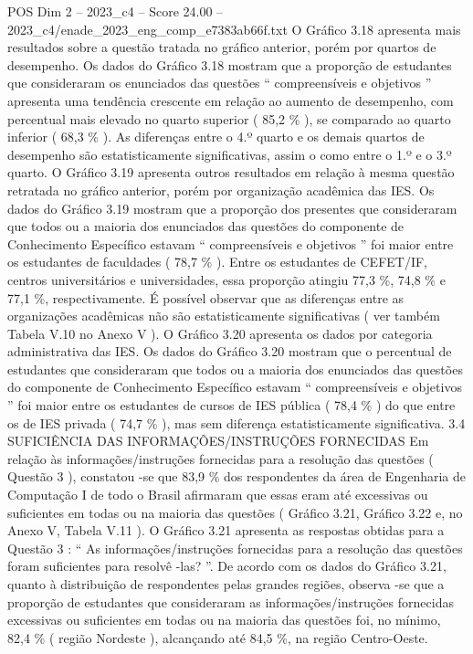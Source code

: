 \begin{textsample}{POS Dim 2 – 2023\_c4 – Score 24.00 – 2023\_c4/enade\_2023\_eng\_comp\_e7383ab66f.txt}
O Gráfico 3.18 apresenta mais resultados sobre a questão tratada no gráfico anterior, porém por quartos de desempenho.
Os dados do Gráfico 3.18 mostram que a proporção de estudantes que consideraram os enunciados das questões “ compreensíveis e objetivos ” apresenta uma tendência crescente em relação ao aumento de desempenho, com percentual mais elevado no quarto superior ( 85,2 \% ), se comparado ao quarto inferior ( 68,3 \% ).
As diferenças entre o 4.º quarto e os demais quartos de desempenho são estatisticamente significativas, assim o como entre o 1.º e o 3.º quarto.
O Gráfico 3.19 apresenta outros resultados em relação à mesma questão retratada no gráfico anterior, porém por organização acadêmica das IES.
Os dados do Gráfico 3.19 mostram que a proporção dos presentes que consideraram que todos ou a maioria dos enunciados das questões do componente de Conhecimento Específico estavam “ compreensíveis e objetivos ” foi maior entre os estudantes de faculdades ( 78,7 \% ).
Entre os estudantes de CEFET/IF, centros universitários e universidades, essa proporção atingiu 77,3 \%, 74,8 \% e 77,1 \%, respectivamente.
É possível observar que as diferenças entre as organizações acadêmicas não são estatisticamente significativas ( ver também Tabela V.10 no Anexo V ).
O Gráfico 3.20 apresenta os dados por categoria administrativa das IES.
Os dados do Gráfico 3.20 mostram que o percentual de estudantes que consideraram que todos ou a maioria dos enunciados das questões do componente de Conhecimento Específico estavam “ compreensíveis e objetivos ” foi maior entre os estudantes de cursos de IES pública ( 78,4 \% ) do que entre os de IES privada ( 74,7 \% ), mas sem diferença estatisticamente significativa. 3.4 SUFICIÊNCIA DAS INFORMAÇÕES/INSTRUÇÕES FORNECIDAS Em relação às informações/instruções fornecidas para a resolução das questões ( Questão 3 ), constatou -se que 83,9 \% dos respondentes da área de Engenharia de Computação I de todo o Brasil afirmaram que essas eram até excessivas ou suficientes em todas ou na maioria das questões ( Gráfico 3.21, Gráfico 3.22 e, no Anexo V, Tabela V.11 ).
O Gráfico 3.21 apresenta as respostas obtidas para a Questão 3 : “ As informações/instruções fornecidas para a resolução das questões foram suficientes para resolvê -las? ”.
De acordo com os dados do Gráfico 3.21, quanto à distribuição de respondentes pelas grandes regiões, observa -se que a proporção de estudantes que consideraram as informações/instruções fornecidas excessivas ou suficientes em todas ou na maioria das questões foi, no mínimo, 82,4 \% ( região Nordeste ), alcançando até 84,5 \%, na região Centro-Oeste.

\end{textsample}
